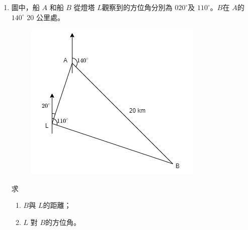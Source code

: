 \documentclass[11pt]{article}
\begin{document}
\begin{enumerate}
    \pagebreak
    \item 圖中，船 $A$ 和船 $B$ 從燈塔 $L$觀察到的方位角分別為 $020^\circ$及 $110^\circ$。$B$在 $A$的$140^\circ$ 20 公里處。\begin{figure}[H]
        \centering
        \includegraphics[scale=0.6]{f4finalq37.png}
    \end{figure}求 \begin{enumerate}
        \item $B$與 $L$的距離；
        \item $L$ 對 $B$的方位角。
    \end{enumerate}

    \hrulefill

        \hrulefill
            
        \hrulefill
        
        \hrulefill
        
        \hrulefill
        
        \hrulefill
        
        \hrulefill
        
        \hrulefill
        
        \hrulefill
        
        \hrulefill
        
        \hrulefill
        
        \hrulefill

        \hrulefill

        \hrulefill
            
        \hrulefill
        
        \hrulefill
        
        \hrulefill
        
        \hrulefill
        

\end{enumerate}
\end{document}
